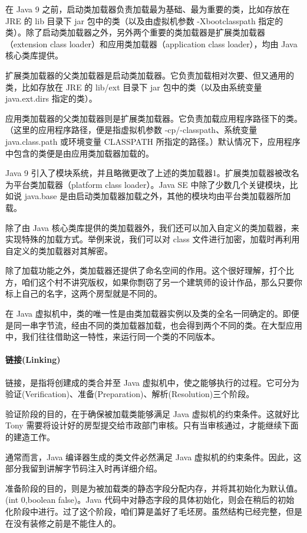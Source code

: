 \documentclass[../../../interview-questions.tex]{subfiles}
\begin{document}
在 Java 9 之前，启动类加载器负责加载最为基础、最为重要的类，比如存放在 JRE 的 lib 目录下 jar 包中的类（以及由虚拟机参数 -Xbootclasspath 指定的类）。除了启动类加载器之外，另外两个重要的类加载器是扩展类加载器（extension class loader）和应用类加载器（application class loader），均由 Java 核心类库提供。

扩展类加载器的父类加载器是启动类加载器。它负责加载相对次要、但又通用的类，比如存放在 JRE 的 lib/ext 目录下 jar 包中的类（以及由系统变量 java.ext.dirs 指定的类）。

应用类加载器的父类加载器则是扩展类加载器。它负责加载应用程序路径下的类。（这里的应用程序路径，便是指虚拟机参数 -cp/-classpath、系统变量 java.class.path 或环境变量 CLASSPATH 所指定的路径。）默认情况下，应用程序中包含的类便是由应用类加载器加载的。

Java 9 引入了模块系统，并且略微更改了上述的类加载器1。扩展类加载器被改名为平台类加载器（platform class loader）。Java SE 中除了少数几个关键模块，比如说 java.base 是由启动类加载器加载之外，其他的模块均由平台类加载器所加载。

除了由 Java 核心类库提供的类加载器外，我们还可以加入自定义的类加载器，来实现特殊的加载方式。举例来说，我们可以对 class 文件进行加密，加载时再利用自定义的类加载器对其解密。

除了加载功能之外，类加载器还提供了命名空间的作用。这个很好理解，打个比方，咱们这个村不讲究版权，如果你剽窃了另一个建筑师的设计作品，那么只要你标上自己的名字，这两个房型就是不同的。

在 Java 虚拟机中，类的唯一性是由类加载器实例以及类的全名一同确定的。即便是同一串字节流，经由不同的类加载器加载，也会得到两个不同的类。在大型应用中，我们往往借助这一特性，来运行同一个类的不同版本。

\paragraph{链接(Linking)}

链接，是指将创建成的类合并至 Java 虚拟机中，使之能够执行的过程。它可分为验证(Verification)、准备(Preparation)、解析(Resolution)三个阶段。

验证阶段的目的，在于确保被加载类能够满足 Java 虚拟机的约束条件。这就好比 Tony 需要将设计好的房型提交给市政部门审核。只有当审核通过，才能继续下面的建造工作。

通常而言，Java 编译器生成的类文件必然满足 Java 虚拟机的约束条件。因此，这部分我留到讲解字节码注入时再详细介绍。

准备阶段的目的，则是为被加载类的静态字段分配内存，并将其初始化为默认值。(int 0,boolean false)。Java 代码中对静态字段的具体初始化，则会在稍后的初始化阶段中进行。过了这个阶段，咱们算是盖好了毛坯房。虽然结构已经完整，但是在没有装修之前是不能住人的。
\end{document}

